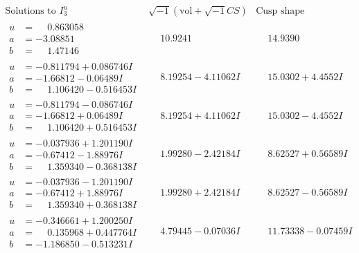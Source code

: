 \documentclass[1p]{elsarticle_modified}
\theoremstyle{definition}
\newcommand{\I}{\sqrt{-1}}
\begin{document}
$$\begin{array}{c|c|c}  
\text{Solutions to }I^u_{3}& \I (\text{vol} + \sqrt{-1}CS) & \text{Cusp shape}\\
 \hline 
\begin{aligned}
u &= \phantom{-}0.863058\phantom{ +0.000000I} \\
a &= -3.08851\phantom{ +0.000000I} \\
b &= \phantom{-}1.47146\phantom{ +0.000000I}\end{aligned}
 & \phantom{-}10.9241\phantom{ +0.000000I} & \phantom{-}14.9390\phantom{ +0.000000I} \\ \hline\begin{aligned}
u &= -0.811794 + 0.086746 I \\
a &= -1.66812 - 0.06489 I \\
b &= \phantom{-}1.106420 - 0.516453 I\end{aligned}
 & \phantom{-}8.19254 - 4.11062 I & \phantom{-}15.0302 + 4.4552 I \\ \hline\begin{aligned}
u &= -0.811794 - 0.086746 I \\
a &= -1.66812 + 0.06489 I \\
b &= \phantom{-}1.106420 + 0.516453 I\end{aligned}
 & \phantom{-}8.19254 + 4.11062 I & \phantom{-}15.0302 - 4.4552 I \\ \hline\begin{aligned}
u &= -0.037936 + 1.201190 I \\
a &= -0.67412 - 1.88976 I \\
b &= \phantom{-}1.359340 - 0.368138 I\end{aligned}
 & \phantom{-}1.99280 - 2.42184 I & \phantom{-}8.62527 + 0.56589 I \\ \hline\begin{aligned}
u &= -0.037936 - 1.201190 I \\
a &= -0.67412 + 1.88976 I \\
b &= \phantom{-}1.359340 + 0.368138 I\end{aligned}
 & \phantom{-}1.99280 + 2.42184 I & \phantom{-}8.62527 - 0.56589 I \\ \hline\begin{aligned}
u &= -0.346661 + 1.200250 I \\
a &= \phantom{-}0.135968 + 0.447764 I \\
b &= -1.186850 - 0.513231 I\end{aligned}
 & \phantom{-}4.79445 - 0.07036 I & \phantom{-}11.73338 - 0.07459 I \\ \hline\begin{aligned}

\end{aligned}
\end{array}$$
\end{document}
